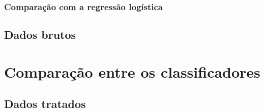 \subsubsection*{Comparação com a regressão logística}


\subsection{Dados brutos}







\section{Comparação entre os classificadores}

\subsection{Dados tratados}


